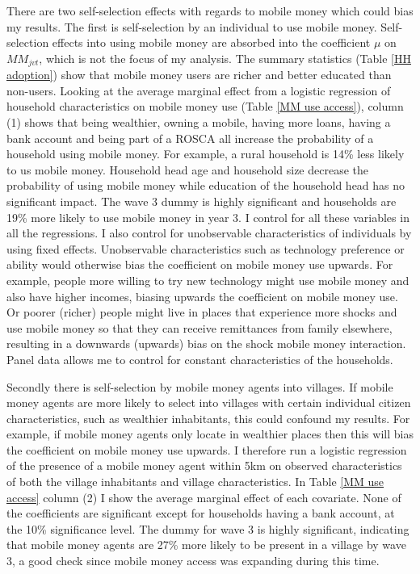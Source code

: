 There are two self-selection effects with regards to mobile money which could bias my results. The first is self-selection by an individual to use mobile money. Self-selection effects into using mobile money are absorbed into the coefficient $\mu$ on $MM_{jvt}$, which is not the focus of my analysis. The summary statistics (Table \ref{HH adoption}) show that mobile money users are richer and better educated than non-users. Looking at the average marginal effect from a logistic regression of household characteristics on mobile money use (Table \ref{MM use access}), column (1) shows that being wealthier, owning a mobile, having more loans, having a bank account and being part of a ROSCA all increase the probability of a household using mobile money. For example, a rural household is 14\% less likely to us mobile money. Household head age and household size decrease the probability of using mobile money while education of the household head has no significant impact. The wave 3 dummy is highly significant and households are 19\% more likely to use mobile money in year 3. I control for all these variables in all the regressions. I also control for unobservable characteristics of individuals by using fixed effects. Unobservable characteristics such as technology preference or ability would otherwise bias the coefficient on mobile money use upwards. For example, people more willing to try new technology might use mobile money and also have higher incomes, biasing upwards the coefficient on mobile money use. Or poorer (richer) people might live in places that experience more shocks and use mobile money so that they can receive remittances from family elsewhere, resulting in a downwards (upwards) bias on the shock mobile money interaction. Panel data allows me to control for constant characteristics of the households.  




Secondly there is self-selection by mobile money agents into villages. If mobile money agents are more likely to select into villages with certain individual citizen characteristics, such as wealthier inhabitants, this could confound my results. For example, if mobile money agents only locate in wealthier places then this will bias the coefficient on mobile money use upwards. I therefore run a logistic regression of the presence of a mobile money agent within 5km on observed characteristics of both the village inhabitants and village characteristics.  In Table \ref{MM use access} column (2) I show the average marginal effect of each covariate. None of the coefficients are significant except for households having a bank account, at the 10\% significance level. The dummy for wave 3 is highly significant, indicating that mobile money agents are 27\% more likely to be present in a village by wave 3, a good check since mobile money access was expanding during this time. 

